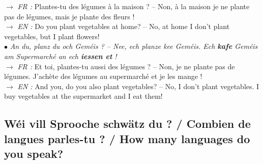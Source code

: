 \begin{itemize}
\begin{itemize}
        $\rightarrow$ \textit{FR :} Plantes-tu des légumes à la maison ? -- Non, à la maison je ne plante pas de légumes, mais je plante des fleurs ! \\
        $\rightarrow$ \textit{EN :} Do you plant vegetables at home? -- No, at home I don't plant vegetables, but I plant flowers! \\
        $\bullet$ \textit{An du, planz du och Geméis ? -- Nee, ech planze kee Geméis. Ech \textbf{kafe} Geméis am Supermarché an ech \textbf{iessen et} !} \\
        $\rightarrow$ \textit{FR :} Et toi, plantes-tu aussi des légumes ? -- Non, je ne plante pas de légumes. J'achète des légumes au supermarché et je les mange ! \\
        $\rightarrow$ \textit{EN :} And you, do you also plant vegetables? -- No, I don't plant vegetables. I buy vegetables at the supermarket and I eat them!
    \end{itemize}
\end{itemize}

\subsection{Wéi vill Sprooche schwätz du ? / Combien de langues parles-tu ? / How many languages do you speak?}


